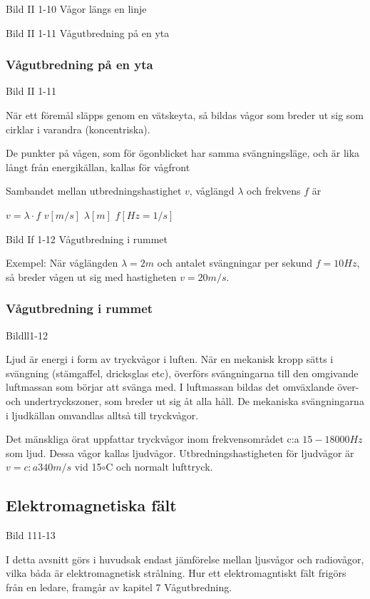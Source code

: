 Bild II 1-10 Vågor längs en linje

Bild II 1-11 Vågutbredning på en yta

\subsubsection{Vågutbredning på en yta}

Bild II 1-11

När ett föremål släpps genom en vätskeyta, så bildas vågor som breder ut sig som cirklar
i varandra (koncentriska).

De punkter på vågen, som för ögonblicket har samma svängningsläge, och är lika långt från
energikällan, kallas för vågfront

Sambandet mellan utbredningshastighet $v$, våglängd $\lambda$ och frekvens $f$ är

$v = \lambda \cdot f$ $v [m/s]$ $\lambda [m]$ $f [Hz=1/s]$

Bild If 1-12 Vågutbredning i rummet

Exempel: När våglängden $\lambda = 2 m$ och antalet svängningar per sekund $f = 10 Hz$,
så breder vågen ut sig med hastigheten $v = 20 m/s$.

\subsubsection{Vågutbredning i rummet}

Bildll1-12

Ljud är energi i form av tryckvågor i luften. När en mekanisk kropp sätts i svängning
(stämgaffel, dricksglas etc), överförs svängningarna till den omgivande luftmassan som
börjar att svänga med. I luftmassan bildas det omväxlande över- och undertryckszoner, som
breder ut sig åt alla håll. De mekaniska svängningarna i ljudkällan omvandlas alltså till
tryckvågor.

Det mänskliga örat uppfattar tryckvågor inom frekvensområdet c:a $15-18000 Hz$ som ljud.
Dessa vågor kallas ljudvågor. Utbredningshastigheten för ljudvågor är $v = c:a 340 m/s$ vid 
15$\circ$C och normalt lufttryck.

\subsection{Elektromagnetiska fält}

Bild 111-13

I detta avsnitt görs i huvudsak endast jämförelse mellan ljusvågor och radiovågor, vilka
båda är elektromagnetisk strålning. Hur ett elektromagntiskt fält frigörs från en ledare,
framgår av kapitel 7 Vågutbredning.

